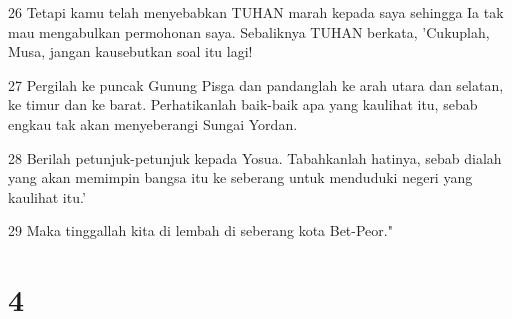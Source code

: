\par 26 Tetapi kamu telah menyebabkan TUHAN marah kepada saya sehingga Ia tak mau mengabulkan permohonan saya. Sebaliknya TUHAN berkata, 'Cukuplah, Musa, jangan kausebutkan soal itu lagi!
\par 27 Pergilah ke puncak Gunung Pisga dan pandanglah ke arah utara dan selatan, ke timur dan ke barat. Perhatikanlah baik-baik apa yang kaulihat itu, sebab engkau tak akan menyeberangi Sungai Yordan.
\par 28 Berilah petunjuk-petunjuk kepada Yosua. Tabahkanlah hatinya, sebab dialah yang akan memimpin bangsa itu ke seberang untuk menduduki negeri yang kaulihat itu.'
\par 29 Maka tinggallah kita di lembah di seberang kota Bet-Peor."

\chapter{4}


